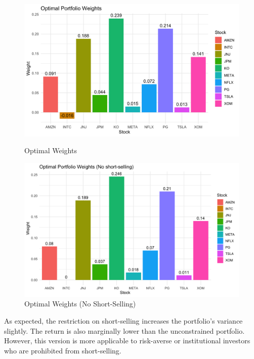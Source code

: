 \documentclass[12pt]{article}
\begin{document}
\begin{figure}[h]
    \centering
    \begin{minipage}{0.48\textwidth}
        \centering
        \includegraphics[width=\linewidth]{Findings_Yutong/weights.png}
        \caption{Optimal Weights}
        \label{opt weights}
    \end{minipage}
    \hfill
    \begin{minipage}{0.48\textwidth}
        \centering
        \includegraphics[width=\linewidth]{Findings_Yutong/portfolio_weights_plot.png}
        \caption{Optimal Weights (No Short-Selling)}
        \label{opt weights no}
    \end{minipage}
\end{figure}
As expected, the restriction on short-selling increases the portfolio's variance slightly. The return is also marginally lower than the unconstrained portfolio. However, this version is more applicable to risk-averse or institutional investors who are prohibited from short-selling.
\end{document}
